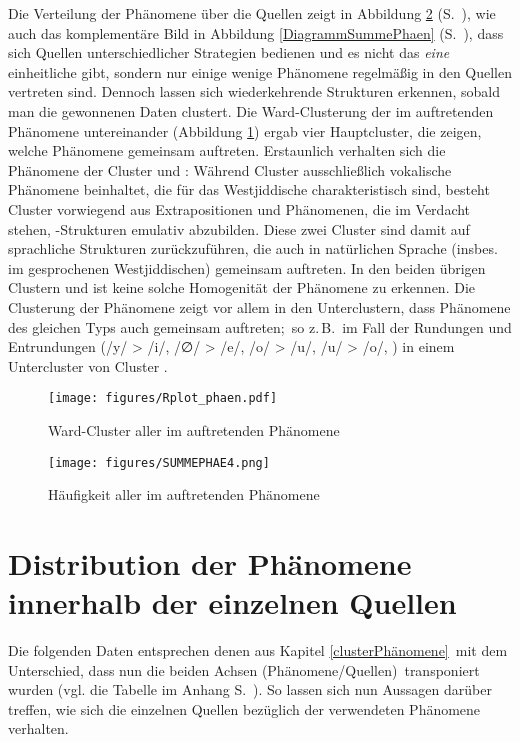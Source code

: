Die Verteilung der Phänomene über die Quellen zeigt in Abbildung \ref{boxplotsummephaen} (S.\, \pageref{boxplotsummephaen}), wie auch das komplementäre Bild in Abbildung \ref{DiagrammSummePhaen} (S.\, \pageref{DiagrammSummePhaen}), dass sich Quellen unterschiedlicher Strategien bedienen und es nicht das \textit{eine} einheitliche  gibt, sondern nur einige wenige Phänomene regelmäßig in den Quellen vertreten sind. Dennoch  lassen sich wiederkehrende Strukturen erkennen, sobald man die gewonnenen Daten clustert. Die Ward-Clusterung der im  auftretenden Phänomene untereinander (Abbildung \ref{boxplotclusterphaen}) ergab vier Hauptcluster, die zeigen, welche Phänomene gemeinsam auftreten. Erstaunlich verhalten sich die Phänomene der Cluster  und : Während Cluster  ausschließlich vokalische Phänomene beinhaltet, die für das Westjiddische charakteristisch sind, besteht Cluster  vorwiegend aus Extrapositionen und Phänomenen, die im Verdacht stehen, \hai{{\VO}}-Strukturen emulativ abzubilden. Diese zwei Cluster sind damit auf sprachliche Strukturen zurückzuführen, die auch in natürlichen Sprache (insbes. im gesprochenen Westjiddischen) gemeinsam auftreten. In den beiden übrigen Clustern  und  ist keine solche Homogenität der Phänomene zu erkennen. Die Clusterung der Phänomene zeigt vor allem in den Unterclustern, dass Phänomene des gleichen Typs auch gemeinsam auftreten;\, so z.\,B.\, im Fall der Rundungen und Entrundungen (/y/ > /i/, /∅/ > /e/, /o/ > /u/, /u/ > /o/, ) in einem Untercluster von Cluster .

 \begin{figure}
\centering
\texttt{[image: figures/Rplot\_phaen.pdf]}
		\caption{\label{boxplotclusterphaen} Ward-Cluster aller im  auftretenden Phänomene}
	\end{figure}
 
 

\begin{figure}
\centering
\texttt{[image: figures/SUMMEPHAE4.png]}
		\caption{\label{boxplotsummephaen} Häufigkeit aller im  auftretenden Phänomene}
	\end{figure}
 
 
 
 \section{Distribution der Phänomene innerhalb der einzelnen Quellen}\label{clusterQuellen}
Die folgenden Daten entsprechen denen aus Kapitel \ref{clusterPhänomene}\, mit dem Unterschied, dass nun die beiden Achsen (Phänomene/Quellen)\, transponiert wurden (vgl. die Tabelle im Anhang S.\, \pageref{appendixphaenall}). So lassen sich nun Aussagen darüber treffen, wie sich die einzelnen Quellen bezüglich der verwendeten Phänomene verhalten.

